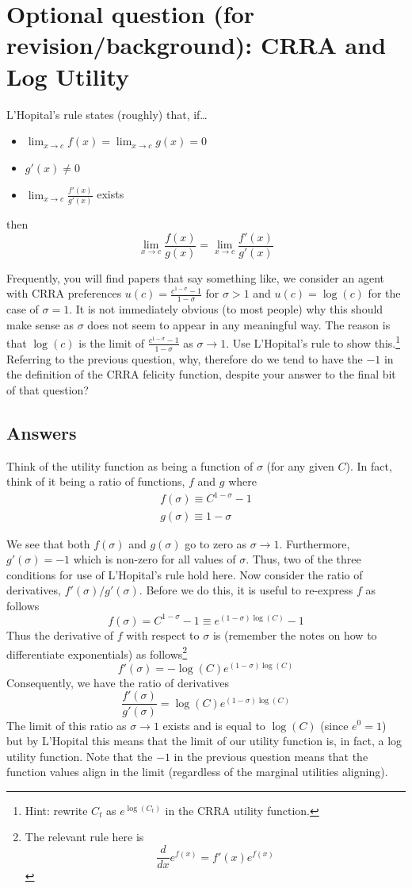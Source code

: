 \documentclass[authoryear,11pt]{elsarticle}
\begin{document}
\section{Optional question (for revision/background): CRRA and Log Utility}
L'Hopital's rule states (roughly) that, if\ldots
\begin{itemize}
\item	$\lim_{x \to c} f(x) = \lim_{x \to c} g(x)=0$
\item	$g'(x)\neq0$
\item	$\lim_{x \to c} \frac{f'(x)}{g'(x)}$ exists
\end{itemize}
then
\[
\lim_{x \to c} \frac{f(x)}{g(x)} = \lim_{x \to c} \frac{f'(x)}{g'(x)}
\]

Frequently, you will find papers that say something like, we consider an agent with CRRA preferences $u(c) = \frac{c^{1-\sigma} - 1}{1-\sigma}$ for $\sigma>1$ and $u(c) = \log{(c)}$ for the case of $\sigma=1$. It is not immediately obvious (to most people) why this should make sense as $\sigma$ does not seem to appear in any meaningful way. The reason is that $\log{(c)}$ is the limit of $\frac{c^{1-\sigma} - 1}{1-\sigma}$ as $\sigma \rightarrow 1$. Use L'Hopital's rule to show this.\footnote{Hint: rewrite $C_{t}$ as $e^{\log{(C_{t})}}$ in the CRRA utility function.} Referring to the previous question, why, therefore do we tend to have the $-1$ in the definition of the CRRA felicity function, despite your answer to the final bit of that question?

\subsection*{Answers}
Think of the utility function as being a function of $\sigma$ (for any given $C$). In fact, think of it being a ratio of functions, $f$ and $g$ where
\begin{eqnarray*}
f(\sigma) \equiv C^{1-\sigma} - 1 \\
g(\sigma) \equiv 1 - \sigma
\end{eqnarray*}

We see that both $f(\sigma)$ and $g(\sigma)$ go to zero as $\sigma \to 1$. Furthermore, $g'(\sigma)=-1$ which is non-zero for all values of $\sigma$. Thus, two of the three conditions for use of L'Hopital's rule hold here. Now consider the ratio of derivatives, $f'(\sigma)/g'(\sigma)$. Before we do this, it is useful to re-express $f$ as follows
\[
f(\sigma) = C^{1-\sigma} - 1 \equiv e^{(1-\sigma)\log{(C)}}-1
\]
Thus the derivative of $f$ with respect to $\sigma$ is (remember the notes on how to differentiate exponentials) as follows\footnote{The relevant rule here is \[\frac{d}{dx}e^{f(x)} = f'(x)e^{f(x)}\]}
\[
f'(\sigma) = -\log{(C)} e^{(1-\sigma)\log{(C)}}
\]
Consequently, we have the ratio of derivatives
\[
\frac{f'(\sigma)}{g'(\sigma)} = \log{(C)} e^{(1-\sigma)\log{(C)}}
\]
The limit of this ratio as $\sigma \to 1$ exists and is equal to $\log{(C)}$ (since $e^{0}=1$) but by L'Hopital this means that the limit of our utility function is, in fact, a log utility function. Note that the $-1$ in the previous question means that the function values align in the limit (regardless of the marginal utilities aligning).
\end{document}
